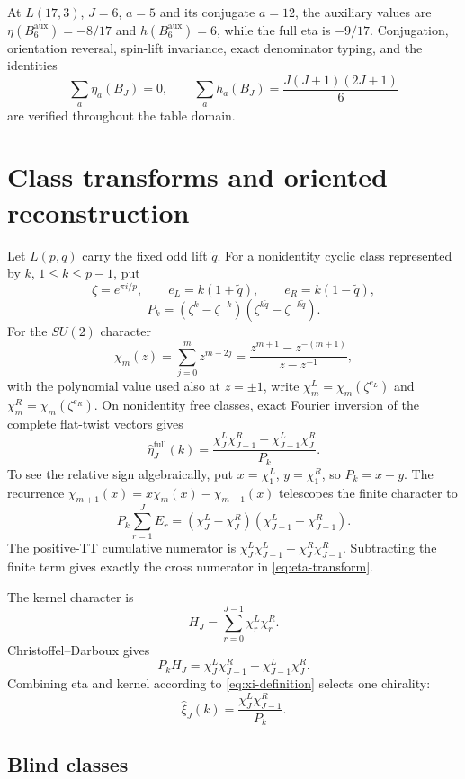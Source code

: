 \documentclass[11pt]{article}
\theoremstyle{definition}
\newcommand{\etaInv}{\eta}
\newcommand{\aux}{\mathrm{aux}}
\newcommand{\full}{\mathrm{full}}
\begin{document}
At $L(17,3)$, $J=6$, $a=5$ and its conjugate $a=12$, the auxiliary values are
$\etaInv(B_6^{\aux})=-8/17$ and $h(B_6^{\aux})=6$, while the full eta is
$-9/17$.  Conjugation, orientation reversal, spin-lift invariance, exact
denominator typing, and the identities
\[
 \sum_a\etaInv_a(B_J)=0,
 \qquad
 \sum_a h_a(B_J)=\frac{J(J+1)(2J+1)}6
\]
are verified throughout the table domain.

\section{Class transforms and oriented reconstruction}
\label{sec:class-transforms}

Let $L(p,q)$ carry the fixed odd lift $\widetilde q$.  For a nonidentity
cyclic class represented by $k$, $1\leq k\leq p-1$, put
\[
 \zeta=e^{\pi i/p},\qquad
 e_L=k(1+\widetilde q),\qquad
 e_R=k(1-\widetilde q),
\]
\[
 P_k=(\zeta^k-\zeta^{-k})
 (\zeta^{k\widetilde q}-\zeta^{-k\widetilde q}).
\]
For the $SU(2)$ character
\[
 \chi_m(z)=\sum_{j=0}^m z^{m-2j}
 =\frac{z^{m+1}-z^{-(m+1)}}{z-z^{-1}},
\]
with the polynomial value used also at $z=\pm1$, write
$\chi_m^L=\chi_m(\zeta^{e_L})$ and
$\chi_m^R=\chi_m(\zeta^{e_R})$.  On nonidentity free classes, exact Fourier
inversion of the complete flat-twist vectors gives
\begin{equation}\label{eq:eta-transform}
 \widehat\etaInv_J^{\full}(k)
 =\frac{
  \chi_J^L\chi_{J-1}^R+\chi_{J-1}^L\chi_J^R
 }{P_k}.
\end{equation}
To see the relative sign algebraically, put $x=\chi_1^L$, $y=\chi_1^R$,
so $P_k=x-y$.  The recurrence $\chi_{m+1}(x)=x\chi_m(x)-\chi_{m-1}(x)$
telescopes the finite character to
\[
 P_k\sum_{r=1}^J E_r
 =(\chi_J^L-\chi_J^R)(\chi_{J-1}^L-\chi_{J-1}^R).
\]
The positive-TT cumulative numerator is
$\chi_J^L\chi_{J-1}^L+\chi_J^R\chi_{J-1}^R$.
Subtracting the finite term gives exactly the cross numerator in
\eqref{eq:eta-transform}.

The kernel character is
\[
 H_J=\sum_{r=0}^{J-1}\chi_r^L\chi_r^R.
\]
Christoffel--Darboux gives
\[
 P_kH_J
 =\chi_J^L\chi_{J-1}^R-\chi_{J-1}^L\chi_J^R.
\]
Combining eta and kernel according to
\eqref{eq:xi-definition} selects one chirality:
\begin{equation}\label{eq:xi-transform}
 \widehat\xi_J(k)
 =\frac{\chi_J^L\chi_{J-1}^R}{P_k}.
\end{equation}

\subsection{Blind classes}
\end{document}
